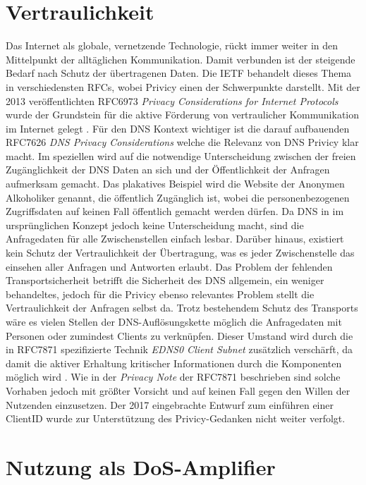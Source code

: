 \section{Vertraulichkeit}
\label{sec:Thread-Priv}

Das Internet als globale, vernetzende Technologie, rückt immer weiter in den Mittelpunkt der alltäglichen Kommunikation. Damit verbunden ist der steigende Bedarf nach Schutz der übertragenen Daten. Die IETF behandelt dieses Thema in verschiedensten RFCs, wobei Privicy einen der Schwerpunkte darstellt. Mit der 2013 veröffentlichten RFC6973 \textit{Privacy Considerations for Internet Protocols}\cite{rfc6973} wurde der Grundstein für die aktive Förderung von vertraulicher Kommunikation im Internet gelegt . 
Für den DNS Kontext wichtiger ist die darauf aufbauenden RFC7626 \textit{DNS Privacy Considerations}\cite{rfc7626} welche die Relevanz von DNS Privicy klar macht. Im speziellen wird auf die notwendige Unterscheidung zwischen der freien Zugänglichkeit der DNS Daten an sich und der Öffentlichkeit der Anfragen aufmerksam gemacht. Das plakatives Beispiel wird die Website der Anonymen Alkoholiker genannt, die öffentlich Zugänglich ist, wobei die personenbezogenen Zugriffsdaten auf keinen Fall öffentlich gemacht werden dürfen. Da DNS in im ursprünglichen Konzept jedoch keine Unterscheidung macht, sind die Anfragedaten für alle Zwischenstellen einfach lesbar. Darüber hinaus, existiert kein Schutz der Vertraulichkeit der Übertragung, was es jeder Zwischenstelle das einsehen aller Anfragen und Antworten erlaubt.
Das Problem der fehlenden Transportsicherheit betrifft die Sicherheit des DNS allgemein, ein weniger behandeltes, jedoch für die Privicy ebenso relevantes Problem stellt die Vertraulichkeit der Anfragen selbst da. Trotz bestehendem Schutz des Transports wäre es vielen Stellen der DNS-Auflösungskette möglich die Anfragedaten mit Personen oder zumindest Clients zu verknüpfen. Dieser Umstand wird durch die in RFC7871 spezifizierte Technik \textit{EDNS0 Client Subnet} zusätzlich verschärft, da damit die aktiver Erhaltung kritischer Informationen durch die Komponenten möglich wird \cite{Contavalli2016}. Wie in der \textit{Privacy Note} der RFC7871 beschrieben sind solche Vorhaben jedoch mit größter Vorsicht und auf keinen Fall gegen den Willen der Nutzenden einzusetzen. Der 2017 eingebrachte Entwurf zum einführen einer ClientID\cite{Licht2017} wurde zur Unterstützung des Privicy-Gedanken nicht weiter verfolgt.

\section{Nutzung als DoS-Amplifier}
\label{sec:Thread-DosAmp}

